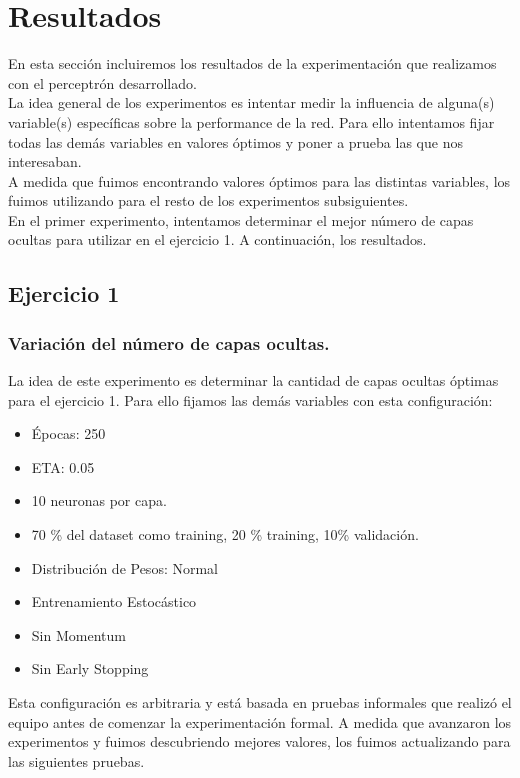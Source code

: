 \section{Resultados}
En esta sección incluiremos los resultados de la experimentación que realizamos con el perceptrón desarrollado.\\
La idea general de los experimentos es intentar medir la influencia de alguna(s) variable(s) específicas sobre la performance
de la red. Para ello intentamos fijar todas las demás variables en valores óptimos y poner a prueba las que nos interesaban.\\

A medida que fuimos encontrando valores óptimos para las distintas variables, los fuimos utilizando para el resto de los experimentos subsiguientes.\\

En el primer experimento, intentamos determinar el mejor número de capas ocultas para utilizar en el ejercicio 1. A continuación, los resultados.

\subsection{Ejercicio 1}

\subsubsection{Variación del número de capas ocultas.}
La idea de este experimento es determinar la cantidad de capas ocultas óptimas para el ejercicio 1. Para ello fijamos las demás variables con esta configuración:

\begin{itemize}
\item Épocas: 250
\item ETA: 0.05
\item 10 neuronas por capa.
\item 70 \% del dataset como training, 20 \% training, 10\% validación.
\item Distribución de Pesos: Normal
\item Entrenamiento Estocástico
\item Sin Momentum
\item Sin Early Stopping
\end{itemize}

Esta configuración es arbitraria y está basada en pruebas informales que realizó el equipo antes de comenzar la experimentación formal. A medida que avanzaron los experimentos y fuimos descubriendo mejores valores, los fuimos actualizando para las siguientes pruebas.\\

